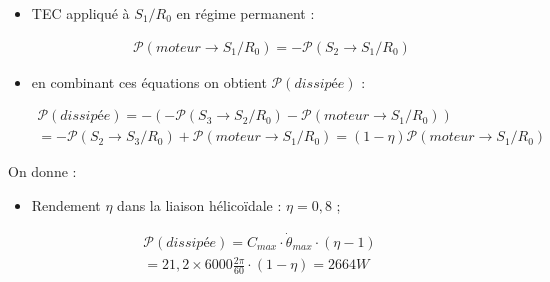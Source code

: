 \documentclass[a4paper,10pt]{article}
\begin{document}
\begin{exemple}
\begin{itemize}
\item TEC appliqué à $S_1/R_0$ en régime permanent :
\begin{texteCache}
\begin{align*}
\mathcal{P}(moteur\to S_1/R_0)=-\mathcal{P}(S_2\to S_1/R_0)
\end{align*}
\end{texteCache}
\item en combinant ces équations on obtient $\mathcal{P}(dissipée)$ : 
\begin{texteCache}
\begin{align*}
\mathcal{P}(dissipée)=-\left(-\mathcal{P}(S_3\to S_2/R_0)-\mathcal{P}(moteur\to S_1/R_0)\right)\\
=-\mathcal{P}(S_2\to S_3/R_0)+\mathcal{P}(moteur\to S_1/R_0)=\left(1-\eta\right)\mathcal{P}(moteur\to S_1/R_0)
\end{align*}
\end{texteCache}
\end{itemize}


\end{exemple}

\begin{exemple}
On donne : 
\begin{itemize}
\item Rendement $\eta$ dans la liaison hélicoïdale : $\eta=0,8$ ; 
\end{itemize}


\begin{texteCache}
\begin{align*}
\mathcal{P}(dissipée)=C_{max}\cdot \dot{\theta}_{max}\cdot \left(\eta-1\right)\\
=21,2\times6000\frac{2\pi}{60}\cdot \left(1-\eta\right)=2664W
\end{align*}
\end{texteCache}
\end{exemple}



	 
\end{document}
